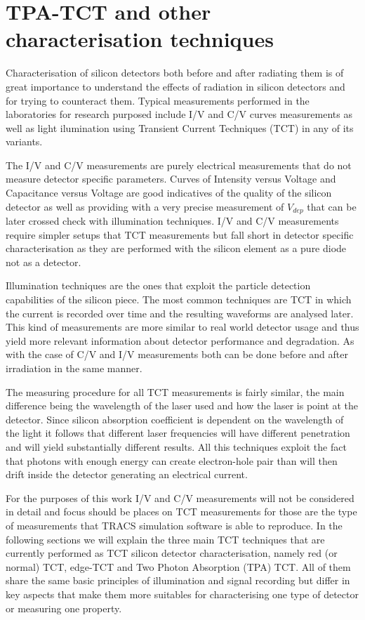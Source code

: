\chapter{TPA-TCT and other characterisation techniques}

Characterisation of silicon detectors both before and after radiating them is of great importance to understand the effects of radiation in silicon detectors and for trying to counteract them. Typical measurements performed in the laboratories for research purposed include I/V and C/V curves measurements as well as light ilumination using Transient Current Techniques (TCT) in any of its variants. 

The I/V and C/V measurements are purely electrical measurements that do not measure detector specific parameters. Curves of Intensity versus Voltage and Capacitance versus Voltage are good indicatives of the quality of the silicon detector as well as providing with a very precise measurement of $V_{dep}$ that can be later crossed check with illumination techniques. I/V and C/V measurements require simpler setups that TCT measurements but fall short in detector specific characterisation as they are performed with the silicon element as a pure diode not as a detector.

Illumination techniques are the ones that exploit the particle detection capabilities of the silicon piece. The most common techniques are TCT in which the current is recorded over time and the resulting waveforms are analysed later. This kind of measurements are more similar to real world detector usage and thus yield more relevant information about detector performance and degradation. As with the case of C/V and I/V measurements both can be done before and after irradiation in the same manner.

The measuring procedure for all TCT measurements is fairly similar, the main difference being the wavelength of the laser used and how the laser is point at the detector. Since silicon absorption coefficient is dependent on the wavelength of the light it follows that different laser frequencies will have different penetration and will yield substantially different results. All this techniques exploit the fact that photons with enough energy can create electron-hole pair than will then drift inside the detector generating an electrical current. 

For the purposes of this work I/V and C/V measurements will not be considered in detail and focus should be places on TCT measurements for those are the type of measurements that TRACS simulation software is able to reproduce. In the following sections we will explain the three main TCT techniques that are currently performed as TCT silicon detector characterisation, namely red (or normal) TCT, edge-TCT and Two Photon Absorption (TPA) TCT. All of them share the same basic principles of illumination and signal recording but differ in key aspects that make them more suitables for characterising one type of detector or measuring one property. 

